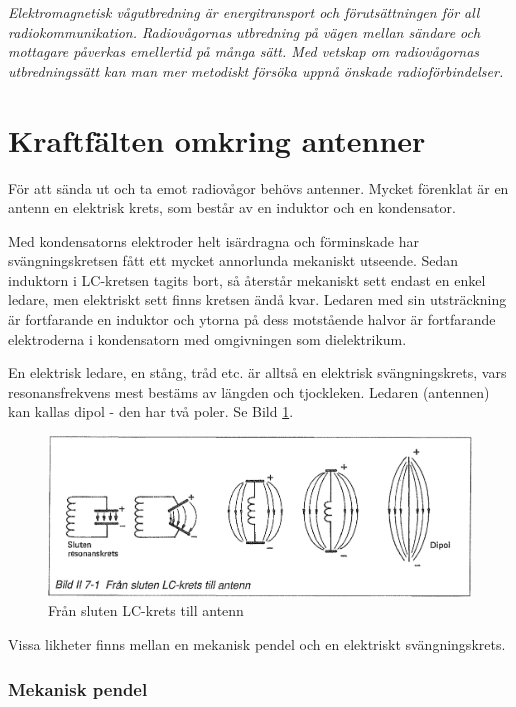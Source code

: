 \emph{Elektromagnetisk vågutbredning är energitransport och
  förutsättningen för all radiokommunikation. Radiovågornas utbredning
  på vägen mellan sändare och mottagare påverkas emellertid på många
  sätt. Med vetskap om radiovågornas utbredningssätt kan man mer
  metodiskt försöka uppnå önskade radioförbindelser.}

\section{Kraftfälten omkring antenner}

För att sända ut och ta emot radiovågor behövs antenner. Mycket
förenklat är en antenn en elektrisk krets, som består av en induktor
och en kondensator.

Med kondensatorns elektroder helt isärdragna och förminskade har
svängningskretsen fått ett mycket annorlunda mekaniskt utseende. Sedan
induktorn i LC-kretsen tagits bort, så återstår mekaniskt sett endast
en enkel ledare, men elektriskt sett finns kretsen ändå kvar. Ledaren
med sin utsträckning är fortfarande en induktor och ytorna på dess
motstående halvor är fortfarande elektroderna i kondensatorn med
omgivningen som dielektrikum.

En elektrisk ledare, en stång, tråd etc. är alltså en elektrisk
svängningskrets, vars resonansfrekvens mest bestäms av längden och
tjockleken. Ledaren (antennen) kan kallas dipol - den har två
poler. Se Bild \ref{fig:BildII7-01}.

\begin{figure}[h]
\begin{center}
\includegraphics[width=14cm]{images/bild_2_7-01}
\caption{Från sluten LC-krets till antenn}
\label{fig:BildII7-01}
\end{center}
\end{figure}

Vissa likheter finns mellan en mekanisk pendel och en elektriskt
svängningskrets.

\subsubsection{Mekanisk pendel}

